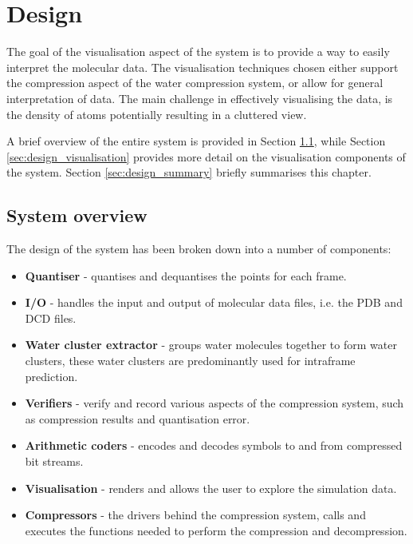 \graphicspath{{./design/}}

\chapter{Design}
\label{cha:design}


The goal of the visualisation aspect of the system is to provide a way to
easily interpret the molecular data. The visualisation techniques chosen either
support the compression aspect of the water compression system, or allow for
general interpretation of data. The main challenge in effectively visualising
the data, is the density of atoms potentially resulting in a cluttered view.

A brief overview of the entire system is provided in Section
\ref{sec:design_overview}, while Section \ref{sec:design_visualisation}
provides more detail on the visualisation components of the system. Section
\ref{sec:design_summary} briefly summarises this chapter.


\section{System overview}
\label{sec:design_overview}


The design of the system has been broken down into a number of components:

\begin{itemize}

  \item \textbf{Quantiser} - quantises and dequantises the points for each
  frame.

  \item \textbf{I/O} - handles the input and output of molecular data files,
  i.e. the PDB and DCD files.

  \item \textbf{Water cluster extractor} - groups water molecules together to
  form water clusters, these water clusters are predominantly used for
  intraframe prediction.

  \item \textbf{Verifiers} - verify and record various aspects of the
  compression system, such as compression results and quantisation error.

  \item \textbf{Arithmetic coders} - encodes and decodes symbols to and from
  compressed bit streams.

  \item \textbf{Visualisation} - renders and allows the user to explore the
  simulation data.

  \item \textbf{Compressors} - the drivers behind the compression system, calls
  and executes the functions needed to perform the compression and
  decompression.

\end{itemize}

